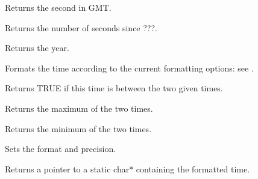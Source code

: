 
Returns the second in GMT.

\label{wxtimegetseconds}


Returns the number of seconds since ???.

\label{wxtimegetyear}


Returns the year.

\label{wxtimeformattime}


Formats the time according to the current formatting options: see .

\label{wxtimeisbetween}


Returns TRUE if this time is between the two given times.

\label{wxtimemax}


Returns the maximum of the two times.

\label{wxtimemin}


Returns the minimum of the two times.

\label{wxtimesetformat}


Sets the format and precision.

\label{wxtimestring}


Returns a pointer to a static char* containing the formatted time.

\label{wxtimewxdate}


